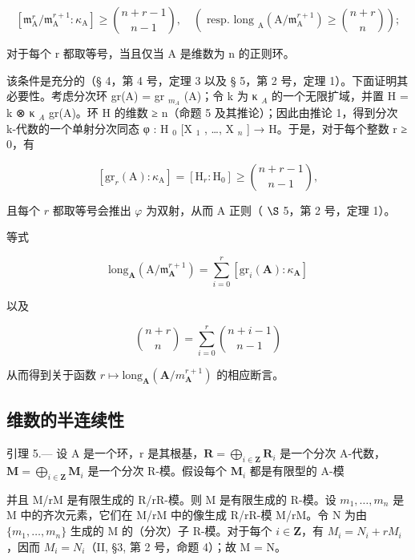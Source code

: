 \[
\left[ \mathfrak {m} _ {\mathrm{A}} ^ {r} / \mathfrak {m} _ {\mathrm{A}} ^ {r + 1}: \kappa_ {\mathrm{A}} \right] \geqslant \binom {n + r - 1} {n - 1}, \quad \left(\text { resp.   long } _ {\mathrm{A}} (\mathrm{A} / \mathfrak {m} _ {\mathrm{A}} ^ {r + 1}) \geqslant \binom {n + r} {n}\right);
\]

对于每个 r 都取等号，当且仅当 A 是维数为 n 的正则环。

该条件是充分的（§ 4，第 4 号，定理 3 以及 § 5，第 2 号，定理 1）。下面证明其必要性。考虑分次环 gr(A) = gr \(_{m_A}\) (A)；令 k 为 κ \(_A\) 的一个无限扩域，并置 H = k ⊗ κ \(_A\) gr(A)。环 H 的维数 ≥ n（命题 5 及其推论）；因此由推论 1，得到分次 k-代数的一个单射分次同态 φ : H \(_0\) {[}X \(_1\) , \ldots, X \(_n\) {]} → H。于是，对于每个整数 r ≥ 0，有

\[
\left[ \mathrm{gr} _ {r} (\mathrm{A}): \kappa_ {\mathrm{A}} \right] = \left[ \mathrm{H} _ {r}: \mathrm{H} _ {0} \right] \geqslant \binom {n + r - 1} {n - 1},
\]

且每个 \(r\) 都取等号会推出 \(\varphi\) 为双射，从而 A 正则（ \(\S\) 5，第 2 号，定理 1）。

等式

\[
\mathrm{long} _ {\mathbf {A}} (\mathrm{A} / \mathfrak {m} _ {\mathbf {A}} ^ {r + 1}) = \sum_ {i = 0} ^ {r} \left[ \mathrm{gr} _ {i} (\mathbf {A}): \kappa_ {\mathbf {A}} \right]
\]

以及

\[
\binom {n + r} {n} = \sum_ {i = 0} ^ {r} \binom {n + i - 1} {n - 1}
\]

从而得到关于函数 \(r \mapsto \text{long}_{\mathbf{A}}(\mathbf{A}/m_{\mathbf{A}}^{r+1})\) 的相应断言。

\subsection{维数的半连续性}

引理 5.--- 设 A 是一个环，r 是其根基，\(\mathbf{R} = \bigoplus_{i \in \mathbf{Z}} \mathbf{R}_i\) 是一个分次 A-代数，\(\mathbf{M} = \bigoplus_{i \in \mathbf{Z}} \mathbf{M}_i\) 是一个分次 R-模。假设每个 \(\mathbf{M}_i\) 都是有限型的 A-模

并且 M/rM 是有限生成的 R/rR-模。则 M 是有限生成的 R-模。设 \(m_{1}, \ldots, m_{n}\) 是 M 中的齐次元素，它们在 M/rM 中的像生成 R/rR-模 M/rM。令 N 为由 \(\{m_{1}, \ldots, m_{n}\}\) 生成的 M 的（分次）子 R-模。对于每个 \(i \in \mathbf{Z}\)，有 \(M_{i} = N_{i} + rM_{i}\)，因而 \(M_{i} = N_{i}\)（II, §3, 第 2 号，命题 4）；故 M = N。

